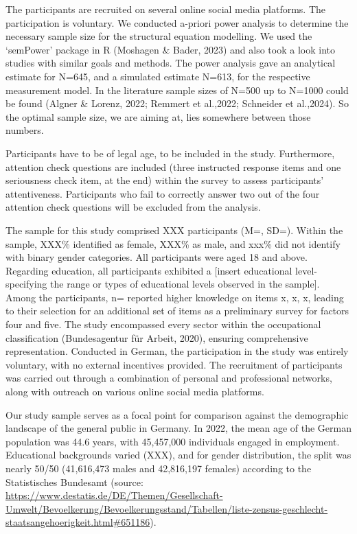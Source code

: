 \documentclass[
  12pt,
  a4paper,
  twoside]{article}
\begin{document}
The participants are recruited on several online social media platforms.
The participation is voluntary. We conducted a-priori power analysis to
determine the necessary sample size for the structural equation
modelling. We used the `semPower' package in R (Moshagen \& Bader, 2023)
and also took a look into studies with similar goals and methods. The
power analysis gave an analytical estimate for N=645, and a simulated
estimate N=613, for the respective measurement model. In the literature
sample sizes of N=500 up to N=1000 could be found (Algner \& Lorenz,
2022; Remmert et al.,2022; Schneider et al.,2024). So the optimal sample
size, we are aiming at, lies somewhere between those numbers.

Participants have to be of legal age, to be included in the study.
Furthermore, attention check questions are included (three instructed
response items and one seriousness check item, at the end) within the
survey to assess participants' attentiveness. Participants who fail to
correctly answer two out of the four attention check questions will be
excluded from the analysis.

The sample for this study comprised XXX participants (M=, SD=). Within
the sample, XXX\% identified as female, XXX\% as male, and xxx\% did not
identify with binary gender categories. All participants were aged 18
and above. Regarding education, all participants exhibited a {[}insert
educational level- specifying the range or types of educational levels
observed in the sample{]}. Among the participants, n= reported higher
knowledge on items x, x, x, leading to their selection for an additional
set of items as a preliminary survey for factors four and five. The
study encompassed every sector within the occupational classification
(Bundesagentur für Arbeit, 2020), ensuring comprehensive representation.
Conducted in German, the participation in the study was entirely
voluntary, with no external incentives provided. The recruitment of
participants was carried out through a combination of personal and
professional networks, along with outreach on various online social
media platforms.

Our study sample serves as a focal point for comparison against the
demographic landscape of the general public in Germany. In 2022, the
mean age of the German population was 44.6 years, with 45,457,000
individuals engaged in employment. Educational backgrounds varied (XXX),
and for gender distribution, the split was nearly 50/50 (41,616,473
males and 42,816,197 females) according to the Statistisches Bundesamt
(source:
\url{https://www.destatis.de/DE/Themen/Gesellschaft-Umwelt/Bevoelkerung/Bevoelkerungsstand/Tabellen/liste-zensus-geschlecht-staatsangehoerigkeit.html\#651186}).
\end{document}

